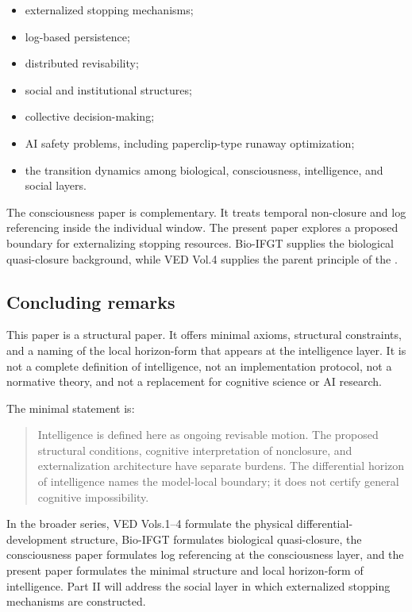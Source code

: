 \begin{itemize}
\item externalized stopping mechanisms;
\item log-based persistence;
\item distributed revisability;
\item social and institutional structures;
\item collective decision-making;
\item AI safety problems, including paperclip-type runaway optimization;
\item the transition dynamics among biological, consciousness, intelligence, and social layers.
\end{itemize}

The consciousness paper is complementary. It treats temporal non-closure and log referencing inside the individual window. The present paper explores a proposed boundary for externalizing stopping resources. Bio-IFGT supplies the biological quasi-closure background, while VED Vol.4 supplies the parent principle of the \DH{}.

\subsection{Concluding remarks}

This paper is a structural paper. It offers minimal axioms, structural constraints, and a naming of the local horizon-form that appears at the intelligence layer. It is not a complete definition of intelligence, not an implementation protocol, not a normative theory, and not a replacement for cognitive science or AI research.

The minimal statement is:

\begin{quote}
Intelligence is defined here as ongoing revisable motion. The proposed structural conditions, cognitive interpretation of nonclosure, and externalization architecture have separate burdens. The differential horizon of intelligence names the model-local boundary; it does not certify general cognitive impossibility.
\end{quote}

In the broader series, VED Vols.1--4 formulate the physical differential-development structure, Bio-IFGT formulates biological quasi-closure, the consciousness paper formulates log referencing at the consciousness layer, and the present paper formulates the minimal structure and local horizon-form of intelligence. Part II will address the social layer in which externalized stopping mechanisms are constructed.
